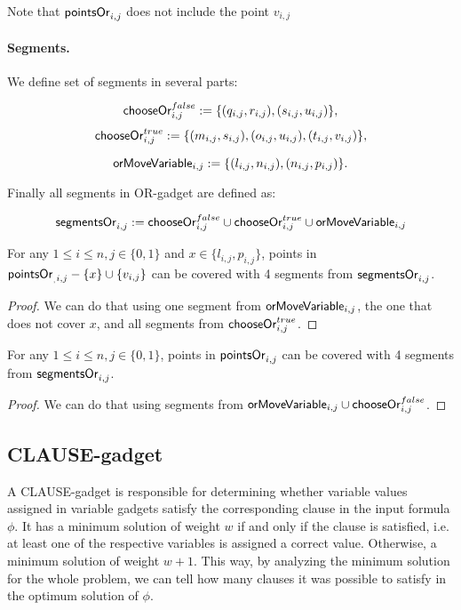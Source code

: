 Note that $\mathsf{pointsOr}_{i,j}$ does not include the point $v_{i,j}$
 
\paragraph{Segments.}

We define set of segments in several parts:
 
$$\mathsf{chooseOr}^{false}_{i,j} :=
\{ (q_{i, j}, r_{i, j}), (s_{i, j}, u_{i, j})\},$$
$$\mathsf{chooseOr}^{true}_{i,j} :=
\{ (m_{i, j}, s_{i, j}), (o_{i, j}, u_{i, j}),
(t_{i, j}, v_{i, j}) \},$$

$$\mathsf{orMoveVariable}_{i,j} :=
\{ (l_{i, j}, n_{i, j}), (n_{i, j}, p_{i, j})\}.$$

Finally all segments in OR-gadget are defined as:

$$\mathsf{segmentsOr}_{i,j} := 
  \mathsf{chooseOr}^{false}_{i,j} \cup \mathsf{chooseOr}^{true}_{i,j} \cup \mathsf{orMoveVariable}_{i,j}
$$


\begin{lemma}
\label{cover_or_true}
For any $1 \le i \le n, j \in \{0, 1\}$ and 
 $x \in \{l_{i, j}, p_{i, j}\}$, points in
$\mathsf{pointsOr}_{_,i, j} - \{ x\} \cup \{v_{i, j}\}$
can be covered
with 4 segments from $\mathsf{segmentsOr}_{i,j}$.
\end{lemma}

\begin{proof}
We can do that using one segment from
$\mathsf{orMoveVariable}_{i,j}$, the one that does not cover $x$,
and all segments from $\mathsf{chooseOr}^{true}_{i,j}$.
\end{proof}

\begin{lemma}
\label{cover_or_false}
For any $1 \le i \le n, j \in \{0, 1\}$, points in
$\mathsf{pointsOr}_{i,j}$ can be covered
with 4 segments from $\mathsf{segmentsOr}_{i,j}$.
\end{lemma}

\begin{proof}
We can do that using segments from $\mathsf{orMoveVariable}_{i,j} \cup \mathsf{chooseOr}^{false}_{i,j}$.
\end{proof}


\subsection{CLAUSE-gadget}
A CLAUSE-gadget is responsible for determining whether
variable values assigned in variable gadgets
satisfy the corresponding clause in the input formula $\phi$.
It has a minimum solution of weight $w$
if and only if the clause is satisfied, i.e. at least one
of the respective variables is assigned a correct value.
Otherwise, a minimum solution of weight $w+1$.
This way, by analyzing the minimum solution for the whole problem,
we can tell how many clauses it was possible to satisfy
in the optimum solution of $\phi$.

